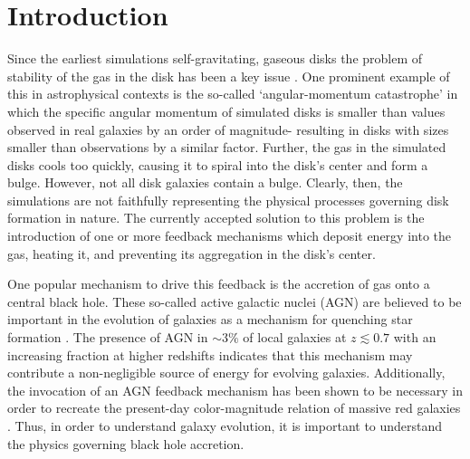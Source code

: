 \section{Introduction}

Since the earliest simulations self-gravitating, gaseous disks the
problem of stability of the gas in the disk has been a key issue \citep[e.g.,][]{lucy1977anumerical}.
One prominent example of this in astrophysical contexts is the so-called
`angular-momentum catastrophe' \citep{navarro1994accretion} in which
the specific angular momentum of simulated disks is smaller than values
observed in real galaxies by an order of magnitude- resulting in disks
with sizes smaller than observations by a similar factor. Further,
the gas in the simulated disks cools too quickly, causing it to spiral
into the disk's center and form a bulge. However, not all disk galaxies
contain a bulge. Clearly, then, the simulations are not faithfully
representing the physical processes governing disk formation in nature.
The currently accepted solution to this problem is the introduction
of one or more feedback mechanisms which deposit energy into the gas,
heating it, and preventing its aggregation in the disk's center.

One popular mechanism to drive this feedback is the accretion of gas
onto a central black hole. These so-called active galactic nuclei
(AGN) are believed to be important in the evolution of galaxies as
a mechanism for quenching star formation \citep[see][and references therein]{hopkins2008acosmological}.
The presence of AGN in $\sim3\%$ of local galaxies at $z\lesssim0.7$
\citep{haggard2010thefield} with an increasing fraction at higher
redshifts \citep{martini2013thecluster} indicates that this mechanism
may contribute a non-negligible source of energy for evolving galaxies.
Additionally, the invocation of an AGN feedback mechanism has been
shown to be necessary in order to recreate the present-day color-magnitude
relation of massive red galaxies \citep{springel2005blackholes}.
Thus, in order to understand galaxy evolution, it is important to
understand the physics governing black hole accretion.

